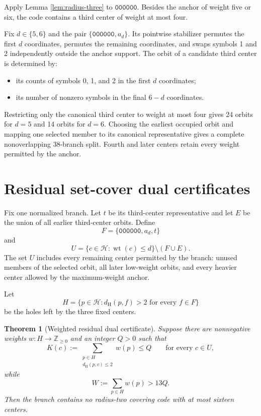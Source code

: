 \documentclass[11pt]{article}
\newtheorem{theorem}{Theorem}
\newcommand{\Hspace}{\mathcal{H}}
\newcommand{\dist}{d_{\mathrm H}}
\newcommand{\wt}{\operatorname{wt}}
\newcommand{\codeword}[1]{\texttt{#1}}
\begin{document}
Apply Lemma \ref{lem:radius-three} to \(\codeword{000000}\).  Besides the
anchor of weight five or six, the code contains a third center of weight at
most four.

Fix \(d\in\{5,6\}\) and the pair
\(\{\codeword{000000},a_d\}\).  Its pointwise stabilizer permutes the first
\(d\) coordinates, permutes the remaining coordinates, and swaps symbols
1 and 2 independently outside the anchor support.  The orbit of a candidate
third center is determined by:

\begin{itemize}[leftmargin=2em]
  \item its counts of symbols 0, 1, and 2 in the first \(d\) coordinates;
  \item its number of nonzero symbols in the final \(6-d\) coordinates.
\end{itemize}

Restricting only the canonical third center to weight at most four gives
24 orbits for \(d=5\) and 14 orbits for \(d=6\).  Choosing the earliest
occupied orbit and mapping one selected member to its canonical
representative gives a complete nonoverlapping 38-branch split.  Fourth and
later centers retain every weight permitted by the anchor.

\section{Residual set-cover dual certificates}

Fix one normalized branch.  Let \(t\) be its third-center representative
and let \(E\) be the union of all earlier third-center orbits.  Define
\[
  F=\{\codeword{000000},a_d,t\}
\]
and
\[
  U=\{c\in\Hspace:\wt(c)\leq d\}\setminus(F\cup E).
\]
The set \(U\) includes every remaining center permitted by the branch:
unused members of the selected orbit, all later low-weight orbits, and every
heavier center allowed by the maximum-weight anchor.

Let
\[
  H=\{p\in\Hspace:\dist(p,f)>2\text{ for every }f\in F\}
\]
be the holes left by the three fixed centers.

\begin{theorem}[Weighted residual dual certificate]
\label{thm:dual}
Suppose there are nonnegative weights
\(w:H\rightarrow\mathbb{Z}_{\geq0}\) and an integer \(Q>0\) such that
\[
  K(c):=
  \sum_{\substack{p\in H\\\dist(p,c)\leq2}}w(p)
  \leq Q
  \qquad\text{for every }c\in U,
\]
while
\[
  W:=\sum_{p\in H}w(p)>13Q.
\]
Then the branch contains no radius-two covering code with at most sixteen
centers.
\end{theorem}
\end{document}
